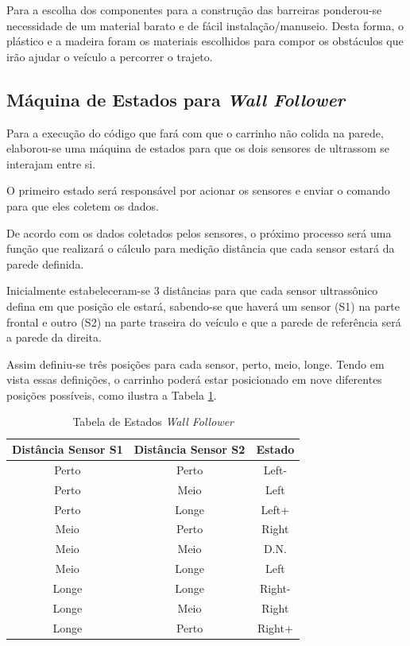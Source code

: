     \vfill
    \pagebreak

    Para a escolha dos componentes para a construção das barreiras ponderou-se
    necessidade de um material barato e de fácil instalação/manuseio.
    Desta forma, o plástico e a madeira foram os materiais escolhidos para compor os obstáculos
    que irão ajudar o veículo a percorrer o trajeto.

  \subsection{Máquina de Estados para \textit{Wall Follower}}
  Para a execução do código que fará com que o carrinho não colida na parede, elaborou-se uma máquina de estados para que os dois sensores de ultrassom se interajam entre si.

  O primeiro estado será responsável por acionar os sensores e enviar o comando para que eles coletem os dados.

  De acordo com os dados coletados pelos sensores, o próximo processo será uma função que realizará o cálculo para medição distância que cada sensor estará da parede definida.

  Inicialmente estabeleceram-se 3 distâncias para que cada sensor ultrassônico defina em que posição ele estará, sabendo-se que haverá um sensor (S1) na parte frontal e outro (S2) na parte traseira do veículo e que a parede de referência será a parede da direita.

  Assim definiu-se três posições para cada sensor, perto, meio, longe. Tendo em vista essas definições, o carrinho poderá estar posicionado em nove diferentes posições possíveis, como ilustra a Tabela \ref{tab:state_wall_follower}.

  \begin{table}[!htbp]
  \centering
  \caption{Tabela de Estados \textit{Wall Follower}}
  \label{tab:state_wall_follower}
  \begin{tabular}{|c|c|c|}
  \hline
  Distância Sensor S1 & Distância Sensor S2 & Estado \\ \hline
  Perto               & Perto                & Left- \\ \hline
  Perto               & Meio                 & Left  \\ \hline
  Perto               & Longe                & Left+ \\ \hline
  Meio                & Perto               & Right  \\ \hline
  Meio                & Meio                & D.N.   \\ \hline
  Meio                & Longe               & Left   \\ \hline
  Longe               & Longe               & Right- \\ \hline
  Longe               & Meio                & Right  \\ \hline
  Longe               & Perto              & Right+  \\ \hline
  \end{tabular}
  \end{table}


